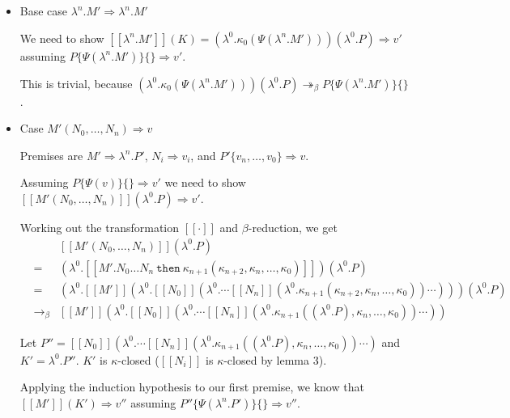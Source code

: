 \documentclass[a4paper,11pt]{article}
\begin{document}
\begin{itemize}
\item{Base case $\lambda^{n}.M' \Rightarrow \lambda^{n}.M'$}

  We need to show $[\![\lambda^{n}.M']\!](K) =
  (\lambda^{0}.\kappa_{0}(\Psi(\lambda^{n}.M'))) (\lambda^{0}.P)
  \Rightarrow v'$ assuming $P\{\Psi(\lambda^{n}.M')\}\{\} \Rightarrow
  v'$.


  This is trivial, because
  $(\lambda^{0}.\kappa_{0}(\Psi(\lambda^{n}.M'))) (\lambda^{0}.P)
  \twoheadrightarrow_{\beta} P\{\Psi(\lambda^{n}.M')\}\{\}$.

\item{Case $M'(N_{0}, \ldots, N_{n}) \Rightarrow v$}

Premises are $M' \Rightarrow \lambda^{n}.P'$, $N_{i} \Rightarrow
v_{i}$, and $P'\{v_{n}, \ldots, v_{0}\} \Rightarrow v$.

Assuming $P\{\Psi(v)\}\{\} \Rightarrow v'$ we need to show
$[\![M'(N_{0}, \ldots, N_{n})]\!](\lambda^{0}.P) \Rightarrow v'$.

Working out the transformation $[\![\cdot]\!]$ and $\beta$-reduction,
we get
\begin{eqnarray*}
&   & [\![M'(N_{0}, \ldots, N_{n})]\!] (\lambda^{0}.P) \\
& = & (\lambda^{0}.[\![M'.N_{0} \ldots N_{n} \: \texttt{then} \: \kappa_{n+1}(\kappa_{n+2}, \kappa_{n}, \ldots, \kappa_{0})]\!]) (\lambda^{0}.P) \\
& = & (\lambda^{0}.[\![M']\!](\lambda^{0}.[\![N_{0}]\!](\lambda^{0}. \cdots [\![N_{n}]\!](\lambda^{0}.\kappa_{n+1}(\kappa_{n+2}, \kappa_{n}, \ldots, \kappa_{0})) \cdots ))) (\lambda^{0}.P) \\
& \rightarrow_{\beta} & [\![M']\!](\lambda^{0}.[\![N_{0}]\!](\lambda^{0}. \cdots [\![N_{n}]\!](\lambda^{0}.\kappa_{n+1}((\lambda^{0}.P), \kappa_{n}, \ldots, \kappa_{0})) \cdots ))
\end{eqnarray*}

Let $P'' = [\![N_{0}]\!](\lambda^{0}. \cdots [\![N_{n}]\!](\lambda^{0}.\kappa_{n+1}((\lambda^{0}.P), \kappa_{n}, \ldots, \kappa_{0})) \cdots )$ and $K' = \lambda^{0}.P''$. $K'$ is $\kappa$-closed ($[\![N_{i}]\!]$ is $\kappa$-closed by lemma 3).

Applying the induction hypothesis to our first premise, we know that $[\![M']\!](K') \Rightarrow v''$ assuming $P''\{\Psi(\lambda^{n}.P')\}\{\} \Rightarrow v''$.


\end{itemize}
\end{document}
